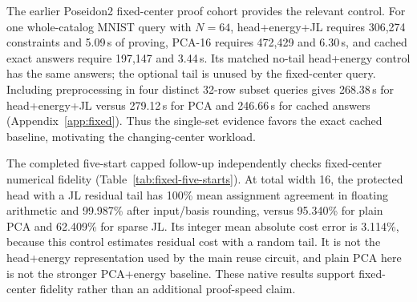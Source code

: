 \documentclass[5p,times,twocolumn]{elsarticle}
\theoremstyle{plain}
\theoremstyle{definition}
\theoremstyle{remark}
\begin{document}
\par\endgroup


\begingroup\color{RevisionGreen}
The earlier Poseidon2 fixed-center proof cohort provides the relevant control. For one whole-catalog MNIST query with $N=64$, head+energy+JL requires 306,274 constraints and 5.09\,s of proving, PCA-16 requires 472,429 and 6.30\,s, and cached exact answers require 197,147 and 3.44\,s. Its matched no-tail head+energy control has the same answers; the optional tail is unused by the fixed-center query. Including preprocessing in four distinct 32-row subset queries gives 268.38\,s for head+energy+JL versus 279.12\,s for PCA and 246.66\,s for cached answers (Appendix~\ref{app:fixed}). Thus the single-set evidence favors the exact cached baseline, motivating the changing-center workload.


\par\endgroup
\begingroup\color{RevisionGreen}
The completed five-start capped follow-up independently checks fixed-center numerical fidelity (Table~\ref{tab:fixed-five-starts}). At total width 16, the protected head with a JL residual tail has 100\% mean assignment agreement in floating arithmetic and 99.987\% after input/basis rounding, versus 95.340\% for plain PCA and 62.409\% for sparse JL. Its integer mean absolute cost error is 3.114\%, because this control estimates residual cost with a random tail. It is not the head+energy representation used by the main reuse circuit, and plain PCA here is not the stronger PCA+energy baseline. These native results support fixed-center fidelity rather than an additional proof-speed claim.
\end{document}
